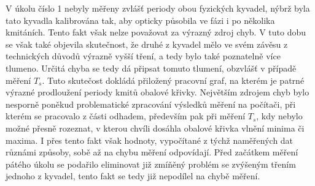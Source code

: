\documentclass[protokol.tex]{subfiles}
\begin{document}
V úkolu číslo 1 nebyly měřeny zvlášť periody obou fyzických kyvadel, nýbrž byla tato kyvadla kalibrována tak, aby opticky působila ve fázi i po několika kmitáních. Tento fakt však nelze považovat za výrazný zdroj chyb. V tuto dobu se však také objevila skutečnost, že druhé z kyvadel mělo ve svém závěsu z technických důvodů výrazně vyšší tření, a tedy bylo také poznatelně více tlumeno. Určitá chyba se tedy dá připsat tomuto tlumení, obzvlášť v případě měření $T_s$. Tuto skutečost dokládá přiložený pracovní graf, na kterém je patrné výrazné prodloužení periody kmitů obalové křivky.
Největším zdrojem chyb bylo nesporně poněkud problematické zpracování výsledků měření na počítači, při kterém se pracovalo z části odhadem, především pak při měření $T_s$, kdy nebylo možné přesně rozeznat, v kterou chvíli dosáhla obalové křivka vlnění minima či maxima. I přes tento fakt však hodnoty, vypočítané z týchž naměřených dat různámi způsoby, sobě až na chybu měření odpovídají.
Před začátkem měření pátého úkolu se podařilo eliminovat již zmíňěný problém se zvýšeným třením jednoho z kyvadel, tento fakt se tedy již nepodílel na chybě měření.
\end{document}
